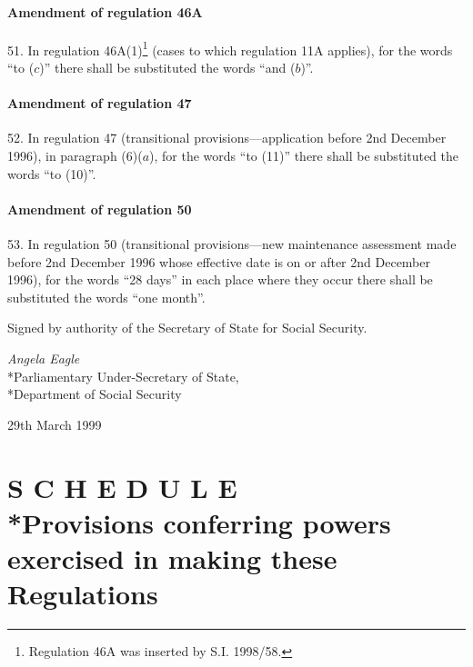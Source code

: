 \documentclass[12pt,a4paper]{article}
\begin{document}
\subsection[51. Amendment of regulation 46A]{Amendment of regulation 46A}

51.  In regulation 46A(1)\footnote{\frenchspacing Regulation 46A was inserted by S.I. 1998/58.} (cases to which regulation 11A applies), for the words “to ($c$)” there shall be substituted the words “and ($b$)”.

\subsection[52. Amendment of regulation 47]{Amendment of regulation 47}

52.  In regulation 47 (transitional provisions—application before 2nd December 1996), in paragraph (6)($a$), for the words “to (11)” there shall be substituted the words “to (10)”.

\subsection[53. Amendment of regulation 50]{Amendment of regulation 50}

53.  In regulation 50 (transitional provisions—new maintenance assessment made before 2nd December 1996 whose effective date is on or after 2nd December 1996), for the words “28 days” in each place where they occur there shall be substituted the words “one month”.

\bigskip

Signed 
by authority of the Secretary of State for Social Security.

{\raggedleft
\emph{Angela Eagle}\\*Parliamentary Under-Secretary of State,\\*Department of Social Security

}

29th March 1999

\small

\part[Schedule --- Provisions conferring powers exercised in making these Regulations]{S C H E D U L E\\*Provisions conferring powers exercised in making these Regulations}

\renewcommand\parthead{--- Schedule}
\end{document}
